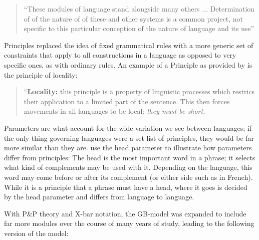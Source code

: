 \documentclass[a4paper,10pt]{article}
\begin{document}
\begin{quote}
	``These modules of language stand alongside many others ... Determination of of the nature of
	of these and other systems is a common project, not specific to this particular conception
	of the nature of language and its use''
	
	\citet{Chomsky95}
\end{quote}

Principles replaced the idea of fixed grammatical rules with a more generic set of constraints that
apply to all constructions in a language as opposed to very specific ones, as with ordinary rules.
\citep[p.~35]{ChUGAI} An example of a Principle as provided by is the principle
of locality:

\begin{quote}
	``\textbf{Locality:} this principle is a property of linguistic processes which restrics their
	application to a limited part of the sentence. This then forces movements in all languages to be
	local: \emph{they must be short.}
	
	\citet[p.~41]{ChUGAI}
\end{quote}

Parameters are what account for the wide variation we see between languages; if the only thing governing
languages were a set list of principles, they would be far more similar than they are.
\citet[p.~44]{ChUGAI} use the head parameter to illustrate how parameters differ from principles:
The head is the most important word in a phrase; it selects what kind of complements may
be used with it. Depending on the language, this word may come before or after its complement
(or either side such as in French). While it is a principle that a phrase must have a head, where
it goes is decided by the head parameter and differs from language to language.

With P\&P theory and X-bar notation, the GB-model was expanded to include far more modules
over the course of many years of study, leading to the following version of the model:
\end{document}
